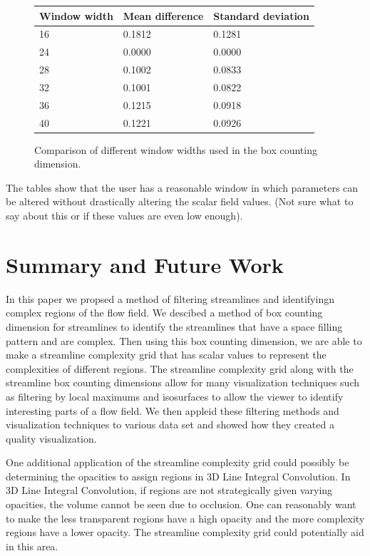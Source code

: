 \documentclass{egpubl}
\begin{document}
\begin{figure}[h]
\begin{tabular}{|l|l|l|}
   \hline
    Window width & Mean difference  & Standard deviation\\
    \hline
16&0.1812&0.1281\\
24&0.0000&0.0000\\
28&0.1002&0.0833\\
32&0.1001&0.0822\\
36&0.1215&0.0918\\
40&0.1221&0.0926\\
     \hline
\end{tabular}
\caption{Comparison of different window widths used in the box counting dimension.}
\label{fig:window_width}
\end{figure}

The tables show that the user has a reasonable window in which parameters can be altered without drastically altering the scalar field values.
(Not sure what to say about this or if these values are even low enough).

\section{Summary and Future Work}

In this paper we propsed a method of filtering streamlines and identifyingn complex regions of the flow field.
We descibed a method of box counting dimension for streamlines to identify the streamlines that have a space filling pattern and are complex.
Then using this box counting dimension, we are able to make a streamline complexity grid that has scalar values to represent the complexities of different regions.
The streamline complexity grid along with the streamline box counting dimensions allow for many visualization techniques such as filtering by local maximums and isosurfaces to allow the viewer to identify interesting parts of a flow field.
We then appleid these filtering methods and visualization techniques to various data set and showed how they created a quality visualization.

One additional application of the streamline complexity grid could possibly be determining the opacities to assign regions in 3D Line Integral Convolution.
In 3D Line Integral Convolution, if regions are not strategically given varying opacities, the volume cannot be seen due to occlusion.
One can reasonably want to make the less transparent regions have a high opacity and the more complexity regions have a lower opacity.
The streamline complexity grid could potentially aid in this area.
\end{document}
